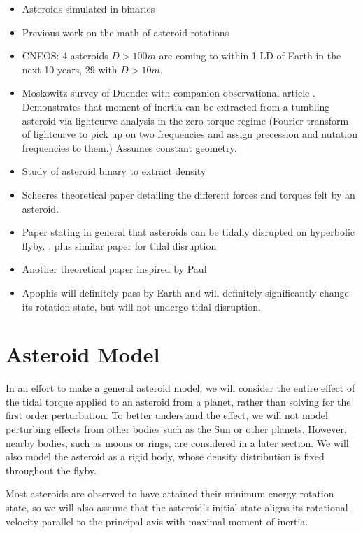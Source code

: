 \documentclass{aastex631}
\begin{document}
\begin{itemize}
\item Asteroids simulated in binaries \cite{Naidu_2015}
\item Previous work on the math of asteroid rotations \cite{ashenberg07, paul88}
\item CNEOS: 4 asteroids $D > 100 m$ are coming to within 1 LD of Earth in the next 10 years, 29 with $D > 10 m$.
\item Moskowitz survey of Duende: \cite{BENSON2020113518} with companion observational article \cite{MOSKOVITZ2020113519}. Demonstrates that moment of inertia can be extracted from a tumbling asteroid via lightcurve analysis in the zero-torque regime (Fourier transform of lightcurve to pick up on two frequencies and assign precession and nutation frequencies to them.) Assumes constant geometry.
\item Study of asteroid binary to extract density \cite{DESCAMPS2020113726}
\item Scheeres theoretical paper \cite{HouMar2017} detailing the different forces and torques felt by an asteroid.
\item Paper stating in general that asteroids can be tidally disrupted on hyperbolic flyby. \cite{SCHEERES2000106}, plus similar paper \cite{RICHARDSON199847} for tidal disruption
\item Another theoretical paper \cite{BOUE2009750} inspired by Paul
\item Apophis will definitely pass by Earth and will definitely significantly change its rotation state, but will not undergo tidal disruption. \cite{SCHEERES2005281}
\end{itemize}


\section{Asteroid Model}
In an effort to make a general asteroid model, we will consider the entire effect of the tidal torque applied to an asteroid from a planet, rather than solving for the first order perturbation. To better understand the effect, we will not model perturbing effects from other bodies such as the Sun or other planets. However, nearby bodies, such as moons or rings, are considered in a later section. We will also model the asteroid as a rigid body, whose density distribution is fixed throughout the flyby.

Most asteroids are observed to have attained their minimum energy rotation state, so we will also assume that the asteroid's initial state aligns its rotational velocity parallel to the principal axis with maximal moment of inertia.
\end{document}

